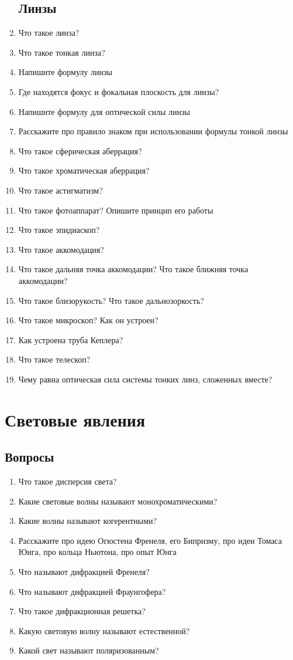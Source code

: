 \documentclass[12pt,a4paper]{report}
\begin{document}
\begin{enumerate}
\section{Линзы}
\item Что такое линза?
\item Что такое тонкая линза?
\item Напишите формулу линзы
\item Где находятся фокус и фокальная плоскость для линзы?
\item Напишите формулу для оптической силы линзы
\item Расскажите про правило знаком при использовании формулы тонкой линзы
\item Что такое сферическая аберрация?
\item Что такое хроматическая аберрация?
\item Что такое астигматизм?
\item Что такое фотоаппарат? Опишите принцип его работы
\item Что такое эпидиаскоп?
\item Что такое аккомодация?
\item Что такое дальняя точка аккомодации? Что такое ближняя точка аккомодации?
\item Что такое близорукость? Что такое дальнозоркость?
\item Что такое микроскоп? Как он устроен?
\item Как устроена труба Кеплера?
\item Что такое телескоп?
\item Чему равна оптическая сила системы тонких линз, сложенных вместе?
\end{enumerate}

\chapter{Световые явления}
\section{Вопросы}
\begin{enumerate}
\item Что такое дисперсия света?
\item Какие световые волны называют монохроматическими?
\item Какие волны называют когерентными? 
\item Расскажите про идею Огюстена Френеля, его Бипризму, про идеи Томаса Юнга, про кольца Ньютона, про опыт Юнга
\item Что называют дифракцией Френеля?
\item Что называют дифракцией Фраунгофера?
\item Что такое дифракционная решетка?
\item Какую световую волну называют естественной?
\item Какой свет называют поляризованным?
\end{enumerate}
\end{document}
